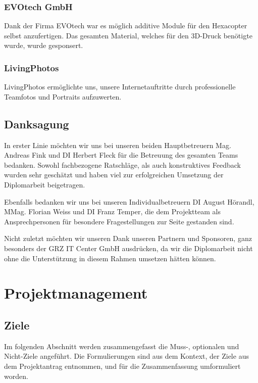 \subsection*{EVOtech GmbH}
Dank der Firma {EVOtech\cite{evotech}} war es möglich additive Module für den Hexacopter selbst anzufertigen.
Das gesamten Material, welches für den 3D-Druck benötigte wurde, wurde gesponsert.

\subsection*{LivingPhotos}
LivingPhotos ermöglichte uns, unsere Internetauftritte durch professionelle Teamfotos und Portraits aufzuwerten.

\section{Danksagung}
In erster Linie möchten wir uns bei unseren beiden Hauptbetreuern Mag. Andreas Fink und DI Herbert Fleck für die
Betreuung des gesamten Teams bedanken. Sowohl fachbezogene Ratschläge, als auch konstruktives Feedback wurden sehr
geschätzt und haben viel zur erfolgreichen Umsetzung der Diplomarbeit beigetragen.

Ebenfalls bedanken wir uns bei unseren Individualbetreuern DI August Hörandl, MMag. Florian Weiss und
DI Franz Temper, die dem Projektteam als Ansprechpersonen für besondere Fragestellungen zur Seite gestanden
sind.

Nicht zuletzt möchten wir unseren Dank unseren Partnern und Sponsoren, ganz besonders der GRZ IT Center GmbH
ausdrücken, da wir die Diplomarbeit nicht ohne die Unterstützung in diesem Rahmen umsetzen hätten können.

\chapter{Projektmanagement}
\renewcommand{\kapitelautor}{Autor: Markus Kaiser}

\section{Ziele}
Im folgenden Abschnitt werden zusammengefasst die Muss-, optionalen und Nicht-Ziele angeführt.
Die Formulierungen sind aus dem Kontext, der Ziele aus dem Projektantrag entnommen, und für die
Zusammenfassung umformuliert worden.

